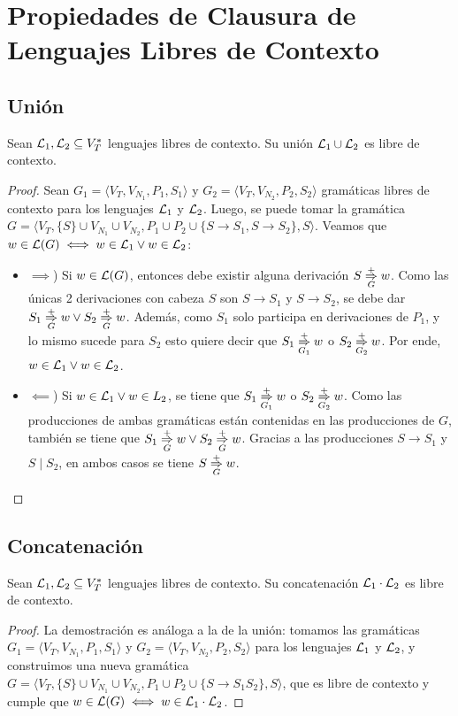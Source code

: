\section{Propiedades de Clausura de Lenguajes Libres de Contexto}

\subsection{Unión}

\begin{theorem*}
    Sean $\mathcal{L}_1, \mathcal{L}_2 \subseteq V_T^*$ lenguajes libres de contexto. Su unión $\mathcal{L}_1 \cup \mathcal{L}_2$ es libre de contexto.
\end{theorem*}
\begin{proof}
    Sean $G_1 = \langle V_T, V_{N_1}, P_1, S_1 \rangle$ y $G_2 = \langle V_T, V_{N_2}, P_2, S_2 \rangle$ gramáticas libres de contexto para los lenguajes $\mathcal{L}_1$ y $\mathcal{L}_2$. Luego, se puede tomar la gramática $G = \langle V_T, \{S\} \cup V_{N_1} \cup V_{N_2}, P_1 \cup P_2 \cup \{S \to S_1, S \to S_2\}, S \rangle$. Veamos que $w \in \mathcal{L}(G) \iff w \in \mathcal{L}_1 \lor w \in \mathcal{L}_2$:
    \begin{itemize}
        \item $\implies$) Si $w \in \mathcal{L}(G)$, entonces debe existir alguna derivación $S \underset{G}{\overset{+}{\Rightarrow}} w$. Como las únicas 2 derivaciones con cabeza $S$ son $S \to S_1$ y $S \to S_2$, se debe dar $S_1 \underset{G}{\overset{+}{\Rightarrow}} w \lor S_2 \underset{G}{\overset{+}{\Rightarrow}} w$. Además, como $S_1$ solo participa en derivaciones de $P_1$, y lo mismo sucede para $S_2$ esto quiere decir que $S_1 \underset{G_1}{\overset{+}{\Rightarrow}} w$ o $S_2 \underset{G_2}{\overset{+}{\Rightarrow}} w$. Por ende, $w \in \mathcal{L}_1 \lor w \in \mathcal{L}_2$.
        \item $\impliedby$) Si $w \in \mathcal{L}_1 \lor w \in L_2$, se tiene que $S_1 \underset{G_1}{\overset{+}{\Rightarrow}} w$ o $S_2 \underset{G_2}{\overset{+}{\Rightarrow}} w$. Como las producciones de ambas gramáticas están contenidas en las producciones de $G$, también se tiene que $S_1 \underset{G}{\overset{+}{\Rightarrow}} w \lor S_2 \underset{G}{\overset{+}{\Rightarrow}} w$. Gracias a las producciones $S \to S_1$ y $S \mid S_2$, en ambos casos se tiene $S \underset{G}{\overset{+}{\Rightarrow}} w$.
    \end{itemize}
\end{proof}

\subsection{Concatenación}

\begin{theorem*}
    Sean $\mathcal{L}_1, \mathcal{L}_2 \subseteq V_T^*$ lenguajes libres de contexto. Su concatenación $\mathcal{L}_1 \cdot \mathcal{L}_2$ es libre de contexto.
\end{theorem*}
\begin{proof}
    La demostración es análoga a la de la unión: tomamos las gramáticas $G_1 = \langle V_T, V_{N_1}, P_1, S_1 \rangle$ y $G_2 = \langle V_T, V_{N_2}, P_2, S_2 \rangle$ para los lenguajes $\mathcal{L}_1$ y $\mathcal{L}_2$, y construimos una nueva gramática $G = \langle V_T, \{S\} \cup V_{N_1} \cup V_{N_2}, P_1 \cup P_2 \cup \{S \to S_1 S_2\}, S \rangle$, que es libre de contexto y cumple que $w \in \mathcal{L}(G) \iff w \in \mathcal{L}_1 \cdot \mathcal{L}_2$.
\end{proof}


